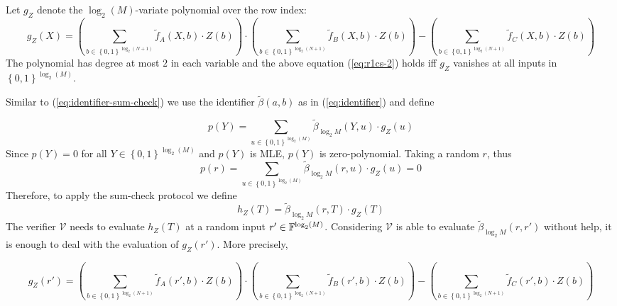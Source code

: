 \documentclass{article}
\begin{document}
Let $g_Z$ denote the $\log_2(M)$-variate polynomial over the row index:
\begin{equation*}
g_Z(X) = \left( \sum_{b \in \left\{ 0, 1 \right\}^{\log_2(N+1)}} \widetilde{f}_A(X, b) \cdot Z(b) \right) \cdot \left( \sum_{b \in \left\{ 0, 1 \right\}^{\log_2(N+1)}} \widetilde{f}_{B}(X, b) \cdot Z(b) \right) - \left( \sum_{b \in \left\{ 0, 1 \right\}^{\log_2(N+1)}} \widetilde{f}_{C}(X, b) \cdot Z(b) \right)
\end{equation*}
The polynomial has degree at most $2$ in each variable and the above equation (\ref{eq:r1cs-2}) holds iff $g_Z$ vanishes at all inputs in $\left\{ 0, 1 \right\}^{\log_2(M)}$.

Similar to (\ref{eq:identifier-sum-check}) we use the identifier $\widetilde{\beta}(a, b)$ as in (\ref{eq:identifier}) and define

\begin{equation*}
p(Y) = \sum_{u \in \left\{ 0, 1 \right\}^{\log_2 (M)}}  \widetilde{\beta}_{\log_2 M}(Y, u) \cdot g_Z(u)
\end{equation*}
Since $p(Y) = 0$ for all $Y \in \left\{ 0, 1 \right\}^{\log_2(M)}$ and $p(Y)$ is MLE, $p(Y)$ is zero-polynomial. Taking a random $r$, thus 
\begin{equation*}
p(r) = \sum_{u \in \left\{ 0, 1 \right\}^{\log_2 (M)}}  \widetilde{\beta}_{\log_2 M}(r, u) \cdot g_Z(u) = 0
\end{equation*}
Therefore, to apply the sum-check protocol we define
\begin{equation*}
h_Z(T) = \widetilde{\beta}_{\log_2 M}(r, T) \cdot g_Z(T)
\end{equation*}
The verifier $\mathcal{V}$ needs to evaluate $h_Z(T)$ at a random input $r' \in \mathbb{F}^{\log_2(M)}$. Considering $\mathcal{V}$ is able to evaluate $\widetilde{\beta}_{\log_2 M}(r, r')$ without help, it is enough to deal with the evaluation of $g_Z(r')$. More precisely,

\begin{equation*}
g_Z(r') =  \left( \sum_{b \in \left\{ 0, 1 \right\}^{\log_2(N+1)}} \widetilde{f}_A(r', b) \cdot Z(b) \right) \cdot \left( \sum_{b \in \left\{ 0, 1 \right\}^{\log_2(N+1)}} \widetilde{f}_{B}(r', b) \cdot Z(b) \right) - \left( \sum_{b \in \left\{ 0, 1 \right\}^{\log_2(N+1)}} \widetilde{f}_{C}(r', b) \cdot Z(b) \right)
\end{equation*} 
\end{document}
